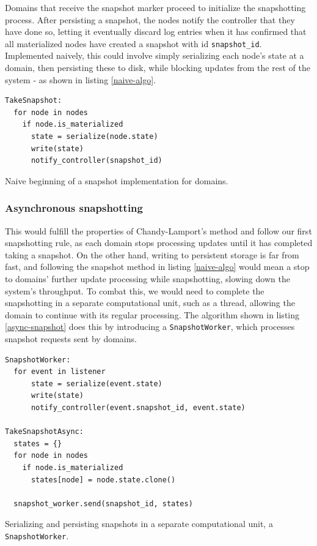 \documentclass[b5paper]{report}
\begin{document}
Domains that receive the snapshot marker proceed to initialize the
snapshotting process. After persisting a snapshot, the nodes notify the
controller that they have done so, letting it eventually discard log entries
when it has confirmed that all materialized nodes have created a snapshot with
id \texttt{snapshot\_id}. Implemented naively, this could involve simply
serializing each node's state at a domain, then persisting these to disk, while
blocking updates from the rest of the system - as shown in listing
\ref{naive-algo}.

\begin{listing}[H]
  \begin{verbatim}
TakeSnapshot:
  for node in nodes
    if node.is_materialized
      state = serialize(node.state)
      write(state)
      notify_controller(snapshot_id)
  \end{verbatim}
  \caption{
    Naive beginning of a snapshot implementation for domains.
    \label{naive-algo}
  }
\end{listing}

\subsubsection{Asynchronous snapshotting} \label{sec:async-snapshot}
This would fulfill the properties of Chandy-Lamport's method and follow our
first snapshotting rule, as each domain stops processing updates until it has
completed taking a snapshot. On the other hand, writing to persistent storage is
far from fast, and following the snapshot method in listing \ref{naive-algo}
would mean a stop to domains' further update processing while snapshotting,
slowing down the system's throughput. To combat this, we would need to complete
the snapshotting in a separate computational unit, such as a thread, allowing
the domain to continue with its regular processing. The algorithm shown in
listing \ref{async-snapshot} does this by introducing a \texttt{SnapshotWorker},
which processes snapshot requests sent by domains.

\begin{listing}[H]
  \begin{verbatim}
SnapshotWorker:
  for event in listener
      state = serialize(event.state)
      write(state)
      notify_controller(event.snapshot_id, event.state)

TakeSnapshotAsync:
  states = {}
  for node in nodes
    if node.is_materialized
      states[node] = node.state.clone()

  snapshot_worker.send(snapshot_id, states)
  \end{verbatim}
  \caption{
    Serializing and persisting snapshots in a separate computational unit, a
    \texttt{SnapshotWorker}.
    \label{async-snapshot}
  }
\end{listing}
\end{document}
